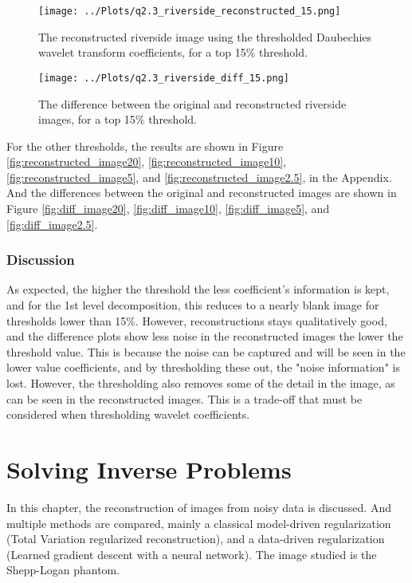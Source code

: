 \documentclass[12pt]{report} %
\begin{document}
\begin{figure}[htbp]
    \centering
    \texttt{[image: ../Plots/q2.3\_riverside\_reconstructed\_15.png]}
    \caption{The reconstructed riverside image using the thresholded Daubechies wavelet transform coefficients, for a top 15\% threshold.}
    \label{fig:reconstructed_image15}
\end{figure}

\begin{figure}[htbp]
    \centering
    \texttt{[image: ../Plots/q2.3\_riverside\_diff\_15.png]}
    \caption{The difference between the original and reconstructed riverside images, for a top 15\% threshold.}
    \label{fig:diff_image15}
\end{figure}


For the other thresholds, the results are shown in Figure \ref{fig:reconstructed_image20}, \ref{fig:reconstructed_image10},  \ref{fig:reconstructed_image5}, and \ref{fig:reconstructed_image2.5}, in the Appendix. And the differences between the original and reconstructed images are shown in Figure \ref{fig:diff_image20}, \ref{fig:diff_image10}, \ref{fig:diff_image5}, and \ref{fig:diff_image2.5}.


\subsection{Discussion}

As expected, the higher the threshold the less coefficient's information is kept, and for the 1st level decomposition, this reduces to a nearly blank image for thresholds lower than 15\%. However, reconstructions stays qualitatively good, and the difference plots show less noise in the reconstructed images the lower the threshold value. This is because the noise can be captured and will be seen in the lower value coefficients, and by thresholding these out, the "noise information" is lost. However, the thresholding also removes some of the detail in the image, as can be seen in the reconstructed images. This is a trade-off that must be considered when thresholding wavelet coefficients.

\chapter{Solving Inverse Problems}

In this chapter, the reconstruction of images from noisy data is discussed. And multiple methods are compared, mainly a classical model-driven regularization (Total Variation regularized reconstruction), and a data-driven regularization (Learned gradient descent with a neural network). The image studied is the Shepp-Logan phantom.
\end{document}
